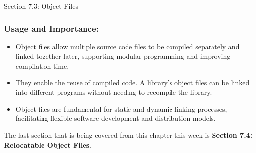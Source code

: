 \begin{notes}{Section 7.3: Object Files}
    
    \subsubsection*{Usage and Importance:}
    
    \begin{itemize}
        \item Object files allow multiple source code files to be compiled separately and linked together later, supporting modular programming and improving compilation time.
        \item They enable the reuse of compiled code. A library's object files can be linked into different programs without needing to recompile the library.
        \item Object files are fundamental for static and dynamic linking processes, facilitating flexible software development and distribution models.
    \end{itemize}    
\end{notes}

The last section that is being covered from this chapter this week is \textbf{Section 7.4: Relocatable Object Files}.


